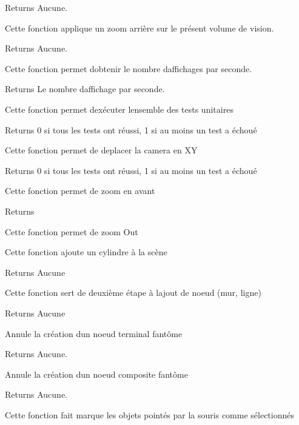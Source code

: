 \begin{DoxyReturn}{Returns}
Aucune.
\end{DoxyReturn}
Cette fonction applique un zoom arrière sur le présent volume de vision.

\begin{DoxyReturn}{Returns}
Aucune.
\end{DoxyReturn}
Cette fonction permet d\textquotesingle{}obtenir le nombre d\textquotesingle{}affichages par seconde.

\begin{DoxyReturn}{Returns}
Le nombre d\textquotesingle{}affichage par seconde.
\end{DoxyReturn}
Cette fonction permet d\textquotesingle{}exécuter l\textquotesingle{}ensemble des tests unitaires

\begin{DoxyReturn}{Returns}
0 si tous les tests ont réussi, 1 si au moins un test a échoué
\end{DoxyReturn}
Cette fonction permet de deplacer la camera en X\+Y

\begin{DoxyReturn}{Returns}
0 si tous les tests ont réussi, 1 si au moins un test a échoué
\end{DoxyReturn}
Cette fonction permet de zoom en avant

\begin{DoxyReturn}{Returns}

\end{DoxyReturn}
Cette fonction permet de zoom Out

Cette fonction ajoute un cylindre à la scène

\begin{DoxyReturn}{Returns}
Aucune
\end{DoxyReturn}
Cette fonction sert de deuxième étape à l\textquotesingle{}ajout de noeud (mur, ligne)

\begin{DoxyReturn}{Returns}
Aucune
\end{DoxyReturn}
Annule la création d\textquotesingle{}un noeud terminal fantôme

\begin{DoxyReturn}{Returns}
Aucune.
\end{DoxyReturn}
Annule la création d\textquotesingle{}un noeud composite fantôme

\begin{DoxyReturn}{Returns}
Aucune.
\end{DoxyReturn}
Cette fonction fait marque les objets pointés par la souris comme sélectionnés

